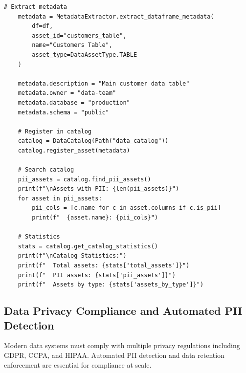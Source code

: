 \begin{lstlisting}[style=python, caption={Enterprise data catalog with automated metadata extraction}]
    # Extract metadata
    metadata = MetadataExtractor.extract_dataframe_metadata(
        df=df,
        asset_id="customers_table",
        name="Customers Table",
        asset_type=DataAssetType.TABLE
    )

    metadata.description = "Main customer data table"
    metadata.owner = "data-team"
    metadata.database = "production"
    metadata.schema = "public"

    # Register in catalog
    catalog = DataCatalog(Path("data_catalog"))
    catalog.register_asset(metadata)

    # Search catalog
    pii_assets = catalog.find_pii_assets()
    print(f"\nAssets with PII: {len(pii_assets)}")
    for asset in pii_assets:
        pii_cols = [c.name for c in asset.columns if c.is_pii]
        print(f"  {asset.name}: {pii_cols}")

    # Statistics
    stats = catalog.get_catalog_statistics()
    print(f"\nCatalog Statistics:")
    print(f"  Total assets: {stats['total_assets']}")
    print(f"  PII assets: {stats['pii_assets']}")
    print(f"  Assets by type: {stats['assets_by_type']}")
\end{lstlisting}

\subsection{Data Privacy Compliance and Automated PII Detection}

Modern data systems must comply with multiple privacy regulations including GDPR, CCPA, and HIPAA. Automated PII detection and data retention enforcement are essential for compliance at scale.

